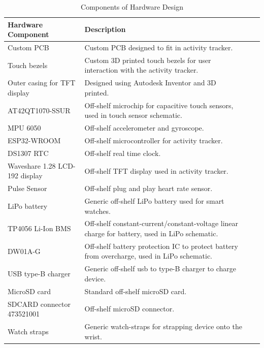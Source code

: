 \documentclass[12pt, titlepage]{article}
\begin{document}
\begin{table}[H]
	\begin{tabularx}{1.05\textwidth} { 
		  | >{\centering\arraybackslash}X 
		  | >{\centering\arraybackslash}X 
		  | >{\centering\arraybackslash}X 
		  | >{\centering\arraybackslash}X | }
		 \hline
		 \textbf{Hardware Component} & \textbf{Description}\\
		 \hline
		Custom PCB & Custom PCB designed to fit in activity tracker.  \\
		\hline 
		Touch bezels & Custom 3D printed touch bezels for user interaction with the activity tracker.\\
		\hline
		Outer casing for TFT display & Designed using Autodesk Inventor and 3D printed. \\
		\hline 
		AT42QT1070-SSUR & Off-shelf microchip for capacitive touch sensors, used in touch sensor schematic.\\
		\hline
		 MPU 6050 & Off-shelf accelerometer and gyroscope.\\
		\hline
		 ESP32-WROOM  & Off-shelf microcontroller for activity tracker.\\
		 \hline
		   DS1307 RTC & Off-shelf real time clock. \\
		\hline
		Waveshare 1.28 LCD-192 display & Off-shelf TFT display used in activity tracker. \\
		\hline 
		Pulse Sensor & Off-shelf plug and play heart rate sensor.\\
		\hline 
		LiPo battery & Generic off-shelf LiPo battery used for smart watches.  \\
		\hline 
		TP4056 Li-Ion BMS & Off-shelf constant-current/constant-voltage linear charge for battery, used in LiPo schematic.\\
		\hline
		DW01A-G & Off-shelf battery protection IC  to protect battery from overcharge, used in LiPo schematic.\\
		\hline
		USB type-B charger & Generic off-shelf usb to type-B charger to charge device. \\
		\hline 
		MicroSD card & Standard off-shelf microSD card. \\
		\hline
		SDCARD connector 473521001& Off-shelf microSD connector. \\
		\hline 
		Watch straps & Generic watch-straps for strapping device onto the wrist. \\
		\hline 
	\end{tabularx}
\caption{\label{DesignHardware}Components of Hardware Design}  
\end{table}
\end{document}
